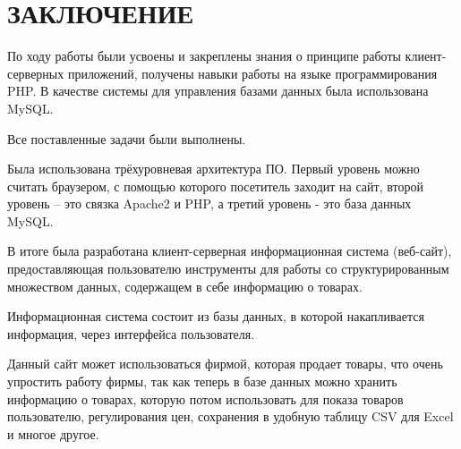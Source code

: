 \newpage

\section*{ЗАКЛЮЧЕНИЕ}

По ходу работы были усвоены и закреплены знания о принципе работы клиент-серверных приложений, получены навыки работы на языке программирования PHP. В качестве системы для управления базами данных была использована MySQL. 

Все поставленные задачи были выполнены.

Была использована трёхуровневая архитектура ПО. Первый уровень можно считать браузером, с помощью которого посетитель заходит на сайт, второй уровень – это связка Apache2 и PHP, а третий уровень - это база данных MySQL.

В итоге была разработана клиент-серверная информационная система (веб-сайт), предоставляющая пользователю инструменты для работы со структурированным множеством данных, содержащем в себе информацию о товарах. 

Информационная система состоит из базы данных, в которой накапливается информация, через интерфейса пользователя.

Данный сайт может использоваться фирмой, которая продает товары, что очень упростить работу фирмы, так как теперь в базе данных можно хранить информацию о товарах, которую потом использовать для показа товаров пользователю, регулирования цен, сохранения в удобную таблицу CSV для Excel и многое другое.

\newpage